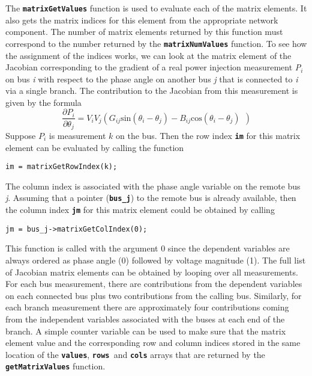 The \texttt{\textbf{matrixGetValues}} function is used to evaluate each of the matrix elements. It also gets the matrix indices for this element from the appropriate network component. The number of matrix elements returned by this function must correspond to the number returned by the \texttt{\textbf{matrixNumValues}} function. To see how the assignment of the indices works, we can look at the matrix element of the Jacobian corresponding to the gradient of a real power injection measurement \textit{P${}_{i}$} on bus \textit{i} with respect to the phase angle on another bus \textit{j} that is connected to \textit{i} via a single branch. The contribution to the Jacobian from this measurement is given by the formula
\[
\frac{\partial P_i}{\partial {\theta }_j}=V_iV_j(G_{ij}{\mathrm{sin}
\left({\theta }_i-{\theta }_j\right)-B_{ij}{\mathrm{cos}
({\theta }_i-{\theta }_j)\ }\ })
\] 
Suppose $P_{i}$ is measurement $k$ on the bus. Then the row index \texttt{\textbf{im}} for this matrix element can be evaluated by calling the function

{
\color{red}
\begin{Verbatim}[fontseries=b]
                im = matrixGetRowIndex(k);
\end{Verbatim}
}

The column index is associated with the phase angle variable on the remote bus \textit{j}. Assuming that a pointer (\texttt{\textbf{bus\_j}}) to the remote bus is already available, then the column index \texttt{\textbf{jm}} for this matrix element could be obtained by calling

{
\color{red}
\begin{Verbatim}[fontseries=b]
                jm = bus_j->matrixGetColIndex(0);
\end{Verbatim}
}

This function is called with the argument 0 since the dependent variables are
always ordered as phase angle (0) followed by voltage magnitude (1). The full list of Jacobian matrix elements can be obtained by looping over all measurements. For each bus measurement, there are contributions from the dependent variables on each connected bus plus two contributions from the calling bus. Similarly, for each branch measurement there are approximately four contributions coming from the independent variables associated with the buses at each end of the branch. A simple counter variable can be used to make sure that the matrix element value and the corresponding row and column indices stored in the same location of the \texttt{\textbf{values}}, \texttt{\textbf{rows }}and \texttt{\textbf{cols}} arrays that are returned by the \texttt{\textbf{getMatrixValues}} function.

